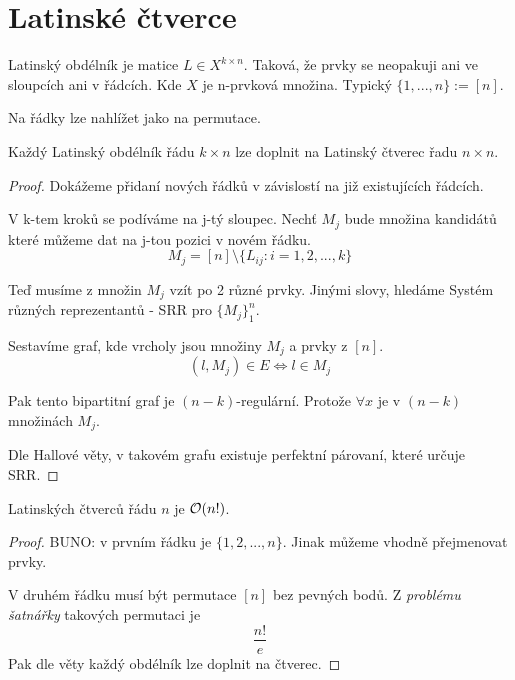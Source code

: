\section{\texorpdfstring{Latinské čtverce}{Latinské čtverce}}
\vspace{5mm}
\large

\begin{definition}
	Latinský obdélník je matice $L \in X^{k \times n}$. Taková, že prvky se neopakuji ani ve sloupcích ani v řádcích.
	Kde $X$ je n-prvková množina. Typický $\{ 1, ..., n \} := [n]$.

	Na řádky lze nahlížet jako na permutace.
\end{definition}

\begin{theorem}
	Každý Latinský obdélník řádu $k \times n$ lze doplnit na Latinský čtverec řadu $n \times n$.
\end{theorem}
\begin{proof}
	Dokážeme přidaní nových řádků v závislostí na již existujících řádcích.

	V k-tem kroků se podíváme na j-tý sloupec.
	Nechť $M_j$ bude množina kandidátů které můžeme dat na j-tou pozici v novém řádku.
	\[ M_j = [n]\setminus \{ L_{ij}: i = 1, 2, ... , k \} \]

	Teď musíme z množin $M_j$ vzít po 2 různé prvky.
	Jinými slovy, hledáme Systém různých reprezentantů - SRR pro $\{ M_j \}_1^n$.

	Sestavíme graf, kde vrcholy jsou množiny $M_j$ a prvky z $[n]$.
	\[ (l, M_j) \in E \iff l \in M_j \]

	Pak tento bipartitní graf je $(n - k)$-regulární.
	Protože $\forall x$ je v $(n - k)$ množinách $M_j$.

	Dle Hallové věty, v takovém grafu existuje perfektní párovaní, které určuje SRR.
\end{proof}

\begin{consequence}
	Latinských čtverců řádu $n$ je $\mathcal{O}(n!)$.
\end{consequence}
\begin{proof}
	BUNO: v prvním řádku je $\{ 1, 2, ..., n \}$.
	Jinak můžeme vhodně přejmenovat prvky.

	V druhém řádku musí být permutace $[n]$ bez pevných bodů.
	Z \emph{problému šatnářky} takových permutaci je
	\[ \frac{n!}{e} \]
	Pak dle věty každý obdélník lze doplnit na čtverec.
\end{proof}

